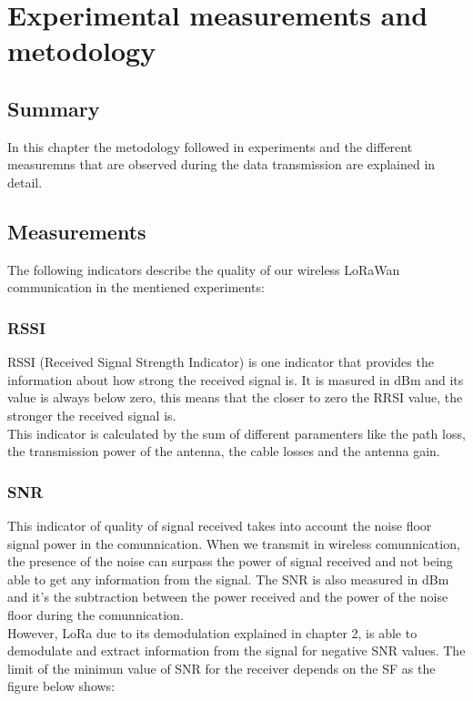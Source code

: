 
\chapter{Experimental measurements and metodology}
\label{chap:ex}
\ifpdf
    \graphicspath{{Chapter4/Figures/PNG/}{Chapter3/Figures/PDF/}{Chapter4/Figures/}}
\else
    \graphicspath{{Chapter4/Figures/EPS/}{Chapter3/Figures/}}
\fi


\section*{Summary}
In this chapter the metodology followed in experiments and the different measuremns 
that are observed during the data transmission are explained in detail.

\section{Measurements} 
\label{chap4:meas}

The following indicators describe the quality of our wireless LoRaWan communication 
in the mentiened experiments:

\subsection{RSSI}
\label{chap4:rssi}

RSSI (Received Signal Strength Indicator) is one indicator that provides the information 
about how strong the received signal is. It is masured in dBm and its value 
is always below zero, this means that the closer to zero the RRSI value, the stronger 
the received signal is.\\
This indicator is calculated by the sum of different paramenters like the path loss, 
the transmission power of the antenna, the cable losses and the antenna gain.

\subsection{SNR}
\label{chap4:snr}

This indicator of quality of signal received takes into account the noise floor signal power in the 
comunnication. When we transmit in wireless comunnication, the presence of the noise can surpass 
the power of signal received and not being able to get any information from the signal. The SNR is 
also measured in dBm and it's the subtraction between the power received and the power of the 
noise floor during the comunnication.\\
However, LoRa due to its demodulation explained in chapter 2, is able to demodulate 
and extract information from the signal for negative SNR values. The limit of the minimun 
value of SNR for the receiver depends on the SF as the figure below shows:

